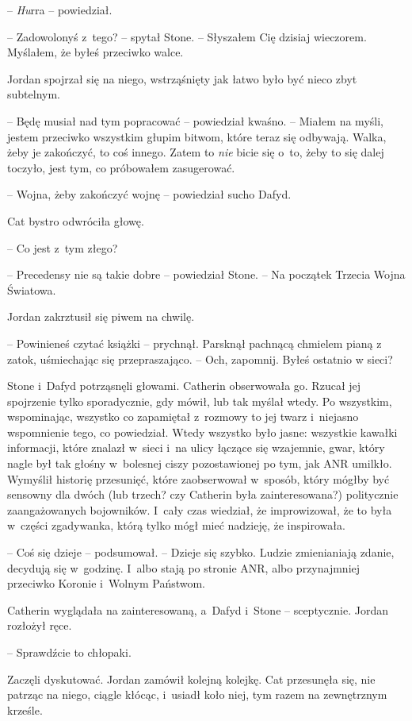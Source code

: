 \documentclass[oneside,polish,11pt,sfheadings]{mwbk}
\begin{document}
-- \emph{Hu}rra -- powiedział.

-- Zadowolonyś z~tego? -- spytał Stone. -- Słyszałem Cię dzisiaj wieczorem.
Myślałem, że byłeś przeciwko walce.

Jordan spojrzał się na niego, wstrząśnięty jak łatwo było być nieco zbyt
subtelnym.

-- Będę musiał nad tym popracować -- powiedział kwaśno. -- Miałem na myśli,
jestem przeciwko wszystkim głupim bitwom, które teraz się odbywają.
Walka, żeby je zakończyć, to coś innego. Zatem to \emph{nie }bicie się o~to, żeby to się dalej toczyło, jest tym, co próbowałem zasugerować.

-- Wojna, żeby zakończyć wojnę -- powiedział sucho Dafyd.

Cat bystro odwróciła głowę. 

-- Co jest z~tym złego?

-- Precedensy nie są takie dobre -- powiedział Stone. -- Na początek
Trzecia Wojna Światowa.

Jordan zakrztusił się piwem na chwilę.

-- Powinieneś czytać książki -- prychnął. Parsknął pachnącą chmielem pianą
z zatok, uśmiechając się przepraszająco. -- Och, zapomnij. Byłeś ostatnio
w sieci?

Stone i~Dafyd potrząsnęli głowami. Catherin obserwowała go. Rzucał jej
spojrzenie tylko sporadycznie, gdy mówił, lub tak myślał wtedy. Po
wszystkim, wspominając, wszyst\-ko co zapamiętał z~rozmowy to jej twarz i~niejasno wspomnienie tego, co powiedział. Wtedy wszystko było jasne:
wszystkie kawałki informacji, które znalazł w~sieci i~na ulicy łączące
się wzajemnie, gwar, który nagle był tak głośny w~bolesnej ciszy
pozostawionej po tym, jak ANR umilkło. Wymyślił historię przesunięć,
które zaobserwował w~sposób, który mógłby być sensowny dla dwóch (lub
trzech? czy Catherin była zainteresowana?) politycznie zaangażowanych
bojowników. I~cały czas wiedział, że improwizował, że to była w~części
zgadywanka, którą tylko mógł mieć nadzieję, że inspirowała.

-- Coś się dzieje -- podsumował. -- Dzieje się szybko. Ludzie zmienianiają
zdanie, decydują się w~godzinę. I~albo stają po stronie ANR, albo
przynajmniej przeciwko Koronie i~Wolnym Państwom.

Catherin wyglądała na zainteresowaną, a~Dafyd i~Stone -- sceptycznie.
Jordan rozłożył ręce. 

-- Sprawdźcie to chłopaki.

Zaczęli dyskutować. Jordan zamówił kolejną kolejkę. Cat przesunęła się,
nie patrząc na niego, ciągle kłócąc, i~usiadł koło niej, tym razem na
zewnętrznym krześle.
\end{document}
